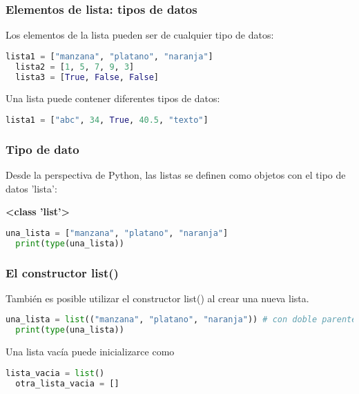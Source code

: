 \begin{frame}[fragile]
  \frametitle{Elementos de lista: tipos de datos}

  Los elementos de la lista pueden ser de cualquier tipo de datos:

  \vspace{\baselineskip}
  \begin{lstlisting}[language=Python]
  lista1 = ["manzana", "platano", "naranja"]
  lista2 = [1, 5, 7, 9, 3]
  lista3 = [True, False, False]
  \end{lstlisting}

  \pausa
  Una lista puede contener diferentes tipos de datos:
  \vspace{\baselineskip}
  \begin{lstlisting}[language=Python]
  lista1 = ["abc", 34, True, 40.5, "texto"]
  \end{lstlisting}
\end{frame}

\begin{frame}[fragile]
  \frametitle{Tipo de dato}

  Desde la perspectiva de Python, las listas se definen
  como objetos con el tipo de datos 'lista':

  \vspace{\baselineskip}
  \textbf{<class 'list'>}

  \vspace{\baselineskip}
  \begin{lstlisting}[language=Python]
  una_lista = ["manzana", "platano", "naranja"]
  print(type(una_lista)) 
  \end{lstlisting}
\end{frame}

\begin{frame}[fragile]
  \frametitle{El constructor list()}

  También es posible utilizar el constructor
  \textcolor{codeKeyword2}{list}() al crear una nueva lista. 

  \vspace{\baselineskip}
  \begin{lstlisting}[language=Python]
  una_lista = list(("manzana", "platano", "naranja")) # con doble parentesis
  print(type(una_lista)) 
  \end{lstlisting}

  \vspace{\baselineskip}
  Una lista vacía puede inicializarce como

  \vspace{\baselineskip}
  \begin{lstlisting}[language=Python]
  lista_vacia = list()
  otra_lista_vacia = []
  \end{lstlisting}

\end{frame}


